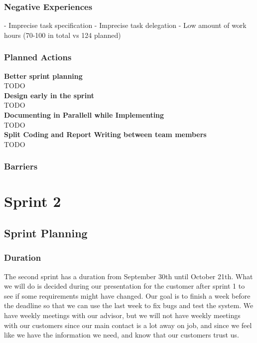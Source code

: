 \documentclass{report}
\begin{document}
\subsection{Negative Experiences} \label{subsec:neg_exp1}
- Imprecise task specification
- Imprecise task delegation
- Low amount of work hours (70-100 in total vs 124 planned)
\subsection{Planned Actions} \label{subsec:planned_act1}
\textbf{Better sprint planning}\\
TODO \\
\textbf{Design early in the sprint}\\
TODO\\
\textbf{Documenting in Parallell while Implementing}\\
TODO\\
\textbf{Split Coding and Report Writing between team members}\\
TODO
\subsection{Barriers} \label{subsec:barriers1}

\chapter{Sprint 2} \label{cha:sprint_2}
\newpage
\section{Sprint Planning} \label{sec:sprint_planning2}
\subsection{Duration} \label{subsec:duration2}
The second sprint has a duration from September 30th until October 21th. What we will do is decided during our presentation for the customer after sprint 1 to see if some requirements might have changed. Our goal is to finish a week before the deadline so that we can use the last week to fix bugs and test the system. We have weekly meetings with our advisor, but we will not have weekly meetings with our customers since our main contact is a lot away on job, and since we feel like we have the information we need, and know that our customers trust us.
\end{document}
